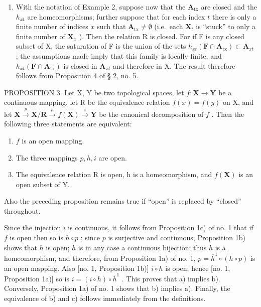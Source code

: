 \begin{enumerate}
\def\labelenumi{\arabic{enumi})}
\setcounter{enumi}{2}
\tightlist
\item
  With the notation of Example 2, suppose now that the \(\mathbf{A}_{\mathrm{tx}}\) are closed and the \(h_{xt}\) are homeomorphisms; further suppose that for each index \(t\) there is only a finite number of indices \(x\) such that \(\mathbf{A}_{\mathrm{tx}} \neq \emptyset\) (i.e.~each \(\mathbf{X}_t\) is ``stuck'' to only a finite number of \(\mathbf{X}_x\) ). Then the relation R is closed. For if F is any closed subset of X, the saturation of F is the union of the sets \(h_{xt}(\mathbf{F} \cap \mathbf{A}_{\mathrm{tx}}) \subset \mathbf{A}_{xt}\) ; the assumptions made imply that this family is locally finite, and \(h_{xt}(\mathbf{F} \cap \mathbf{A}_{\mathrm{tx}})\) is closed in \(\mathbf{A}_{xt}\) and therefore in X. The result therefore follows from Proposition 4 of § 2, no. 5.
\end{enumerate}

PROPOSITION 3. Let X, Y be two topological spaces, let \(f: \mathbf{X} \to \mathbf{Y}\) be a continuous mapping, let R be the equivalence relation \(f(x) = f(y)\) on X, and let \(\mathbf{X} \xrightarrow{p} \mathbf{X}/\mathbf{R} \xrightarrow{h} f(\mathbf{X}) \xrightarrow{i} \mathbf{Y}\) be the canonical decomposition of \(f\) . Then the following three statements are equivalent:

\begin{enumerate}
\def\labelenumi{\alph{enumi})}
\item
  \(f\) is an open mapping.
\item
  The three mappings \(p, h, i\) are open.
\item
  The equivalence relation R is open, h is a homeomorphism, and \(f(\mathbf{X})\) is an open subset of Y.
\end{enumerate}

Also the preceding proposition remains true if ``open'' is replaced by ``closed'' throughout.

Since the injection \(i\) is continuous, it follows from Proposition 1c) of no. 1 that if \(f\) is open then so is \(h \circ p\) ; since \(p\) is surjective and continuous, Proposition 1b) shows that \(h\) is open; \(h\) is in any case a continuous bijection; thus \(h\) is a homeomorphism, and therefore, from Proposition 1a) of no. 1, \(p = \overline{h}^1 \circ (h \circ p)\) is an open mapping. Also {[}no. 1, Proposition 1b){]} \(i \circ h\) is open; hence {[}no. 1, Proposition 1a){]} so is \(i = (i \circ h) \circ \overline{h}^1\) . This proves that a) implies b). Conversely, Proposition 1a) of no. 1 shows that b) implies a). Finally, the equivalence of b) and c) follows immediately from the definitions.


